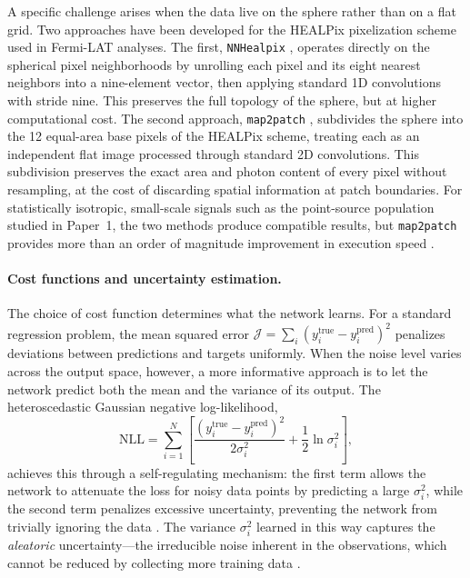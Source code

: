 A specific challenge arises when the data live on the sphere rather than on a flat grid. Two approaches have been developed for the HEALPix pixelization scheme used in Fermi-LAT analyses. The first, \texttt{NNHealpix} \cite{Krachmalnicoff:2019}, operates directly on the spherical pixel neighborhoods by unrolling each pixel and its eight nearest neighbors into a nine-element vector, then applying standard 1D convolutions with stride nine. This preserves the full topology of the sphere, but at higher computational cost. The second approach, \texttt{map2patch} \cite{Amerio:2023dns}, subdivides the sphere into the 12 equal-area base pixels of the HEALPix scheme, treating each as an independent flat image processed through standard 2D convolutions. This subdivision preserves the exact area and photon content of every pixel without resampling, at the cost of discarding spatial information at patch boundaries. For statistically isotropic, small-scale signals such as the point-source population studied in Paper~1, the two methods produce compatible results, but \texttt{map2patch} provides more than an order of magnitude improvement in execution speed \cite{Amerio:2023dns}.

\paragraph{Cost functions and uncertainty estimation.}

The choice of cost function determines what the network learns. For a standard regression problem, the mean squared error $\mathcal{J} = \sum_i (y_i^\mathrm{true} - y_i^\mathrm{pred})^2$ penalizes deviations between predictions and targets uniformly. When the noise level varies across the output space, however, a more informative approach is to let the network predict both the mean and the variance of its output. The heteroscedastic Gaussian negative log-likelihood,
\begin{equation}
\mathrm{NLL} = \sum_{i=1}^{N} \left[ \frac{(y_i^\mathrm{true} - y_i^\mathrm{pred})^2}{2\sigma_i^2} + \frac{1}{2}\ln \sigma_i^2 \right],
\label{eq:heteroscedastic_nll}
\end{equation}
achieves this through a self-regulating mechanism: the first term allows the network to attenuate the loss for noisy data points by predicting a large $\sigma_i^2$, while the second term penalizes excessive uncertainty, preventing the network from trivially ignoring the data \cite{Kendall:2017}. The variance $\sigma_i^2$ learned in this way captures the \textit{aleatoric} uncertainty---the irreducible noise inherent in the observations, which cannot be reduced by collecting more training data \cite{Kendall:2017}.

